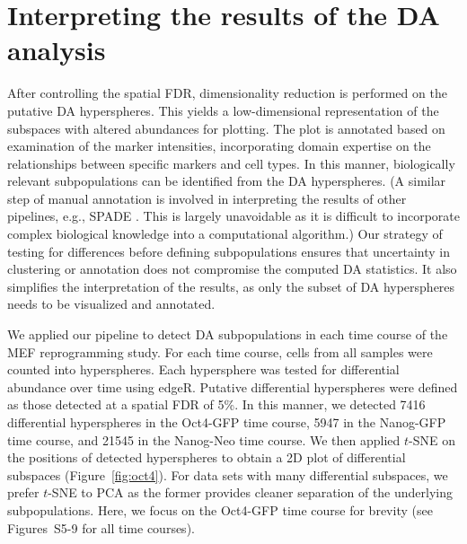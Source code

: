 \documentclass{article}
\newcommand{\suppfigrealextra}{S5-9}
\begin{document}
\section{Interpreting the results of the DA analysis}
After controlling the spatial FDR, dimensionality reduction is performed on the putative DA hyperspheres.
This yields a low-dimensional representation of the subspaces with altered abundances for plotting.
The plot is annotated based on examination of the marker intensities, incorporating domain expertise on the relationships between specific markers and cell types.
In this manner, biologically relevant subpopulations can be identified from the DA hyperspheres.
(A similar step of manual annotation is involved in interpreting the results of other pipelines, e.g., SPADE \cite{anchang2016visualization}.
This is largely unavoidable as it is difficult to incorporate complex biological knowledge into a computational algorithm.)
Our strategy of testing for differences before defining subpopulations ensures that uncertainty in clustering or annotation does not compromise the computed DA statistics.
It also simplifies the interpretation of the results, as only the subset of DA hyperspheres needs to be visualized and annotated.

We applied our pipeline to detect DA subpopulations in each time course of the MEF reprogramming study.
For each time course, cells from all samples were counted into hyperspheres.
Each hypersphere was tested for differential abundance over time using edgeR.
Putative differential hyperspheres were defined as those detected at a spatial FDR of 5\%.
In this manner, we detected 7416 differential hyperspheres in the Oct4-GFP time course, 5947 in the Nanog-GFP time course, and 21545 in the Nanog-Neo time course.
We then applied $t$-SNE \cite{van2008visualizing} on the positions of detected hyperspheres to obtain a 2D plot of differential subspaces (Figure~\ref{fig:oct4}).
For data sets with many differential subspaces, we prefer $t$-SNE to PCA as the former provides cleaner separation of the underlying subpopulations.
Here, we focus on the Oct4-GFP time course for brevity (see Figures~\suppfigrealextra{} for all time courses).
\end{document}
